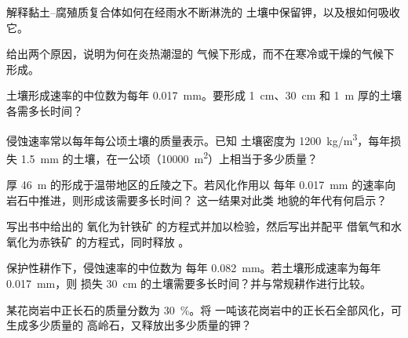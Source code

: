 \begin{exercise}[$\star\star$]\label{exo:g10:soil-formation:8}
解释黏土–腐殖质复合体如何在经雨水不断淋洗的
土壤中保留钾，以及根如何吸收它。
\end{exercise}

\begin{exercise}[$\star\star$]\label{exo:g10:soil-formation:9}
给出两个原因，说明为何在炎热潮湿的
气候下形成，而不在寒冷或干燥的气候下形成。
\end{exercise}

\begin{exercise}[$\star\star$]\label{exo:g10:soil-formation:10}
土壤形成速率的中位数为每年 \qty{0.017}{mm}。要形成
\qty{1}{cm}、\qty{30}{cm} 和 \qty{1}{m} 厚的土壤各需多长时间？
\end{exercise}

\begin{exercise}[$\star\star$]\label{exo:g10:soil-formation:11}
侵蚀速率常以每年每公顷土壤的质量表示。已知
土壤密度为 \qty{1200}{kg/m^3}，每年损失
\qty{1.5}{mm} 的土壤，在一公顷（\qty{10000}{m^2}）上相当于多少质量？
\end{exercise}

\begin{exercise}[$\star\star\star$]\label{exo:g10:soil-formation:12}
厚 \qty{46}{m} 的形成于温带地区的丘陵之下。若风化作用以
每年 \qty{0.017}{mm} 的速率向岩石中推进，则形成该需要多长时间？
这一结果对此类
地貌的年代有何启示？
\end{exercise}

\begin{exercise}[$\star\star\star$]\label{exo:g10:soil-formation:13}
写出书中给出的  氧化为针铁矿
的方程式并加以检验，然后写出并配平
 借氧气和水氧化为赤铁矿  的方程式，同时释放 。
\end{exercise}

\begin{exercise}[$\star\star\star$]\label{exo:g10:soil-formation:14}
保护性耕作下，侵蚀速率的中位数为
每年 \qty{0.082}{mm}。若土壤形成速率为每年 \qty{0.017}{mm}，则
损失 \qty{30}{cm} 的土壤需要多长时间？并与常规耕作进行比较。
\end{exercise}

\begin{exercise}[$\star\star\star$]\label{exo:g10:soil-formation:15}
某花岗岩中正长石的质量分数为 \qty{30}{\percent}。将
一吨该花岗岩中的正长石全部风化，可生成多少质量的
高岭石，又释放出多少质量的钾？
\end{exercise}

